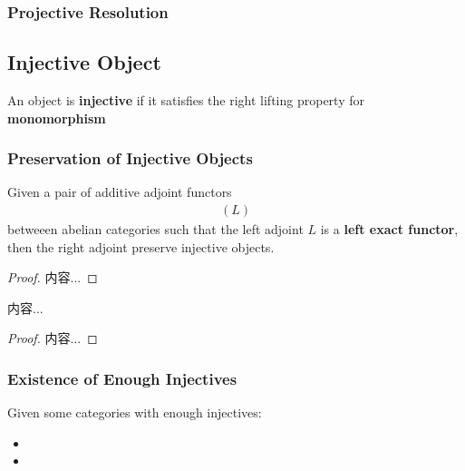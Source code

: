 \documentclass[Total.tex]{subfiles}
\begin{document}
				\subsubsection{Projective Resolution}
				\subsection{Injective Object}
					\begin{Def}
						An object is \textbf{injective} if it satisfies the right lifting property for \textbf{monomorphism}
						\begin{center}
						\end{center}
					\end{Def}
					\subsubsection{Preservation of Injective Objects}
					\begin{lemma}
						Given a pair of additive adjoint functors
						\begin{gather*}
							(L)
						\end{gather*}
						betweeen abelian categories such that the left adjoint $L$ is a \textbf{left exact functor}, then the right adjoint preserve injective objects.
					\end{lemma}
					\begin{proof}
						内容...
					\end{proof}
					
					\begin{proposition}
						内容...
					\end{proposition}
					\begin{proof}
						内容...
					\end{proof}
					\subsubsection{Existence of Enough Injectives}
					Given some categories with enough injectives:
					\begin{itemize}
						\item 
						\item 
					\end{itemize}
					
\end{document}
